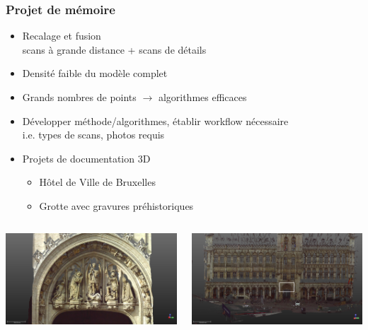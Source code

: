 \documentclass{beamer}
\begin{document}
\begin{frame}
\frametitle{Projet de mémoire}
	\begin{itemize}
	\item Recalage et fusion
		\\ scans à grande distance + scans de détails
	\item Densité faible du modèle complet
	\item Grands nombres de points $\rightarrow$ algorithmes efficaces
	\item Développer méthode/algorithmes, établir workflow nécessaire
		\\ i.e. types de scans, photos requis
	\item Projets de documentation 3D
		\begin{itemize}
		\item Hôtel de Ville de Bruxelles
		\item Grotte avec gravures préhistoriques
		\end{itemize}
	\end{itemize}
	\begin{columns}
		\begin{column}[T]{.5\textwidth}
			\includegraphics[width=\textwidth]{HotelDeVille_08.png}
		\end{column}
		\begin{column}[T]{.5\textwidth}
			\includegraphics[width=\textwidth]{HotelDeVille_06rect.png}
		\end{column}
	\end{columns}
\end{frame}
\end{document}

